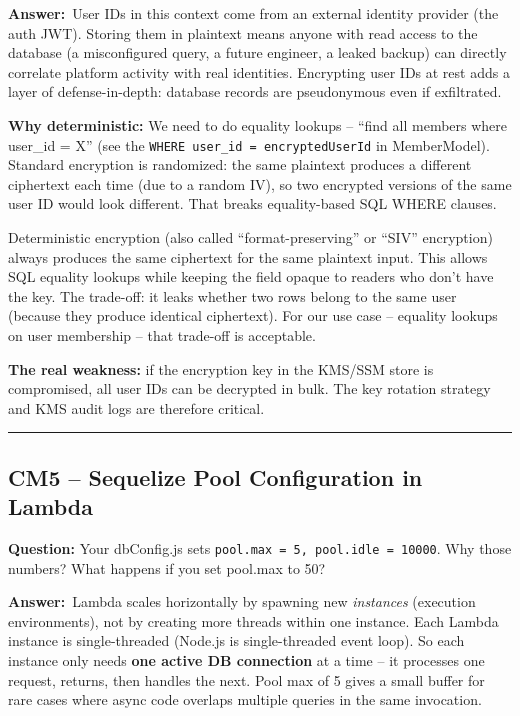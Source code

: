 \documentclass[letterpaper,10pt]{article}
\newlength{\boxwidth}
\newcommand{\questionbox}[1]{%
  \vspace{6pt}%
  \noindent\colorbox{qbg}{%
    \begin{minipage}{\boxwidth}%
      \vspace{3pt}\textbf{\textcolor{nordblue}{Question:}} #1\vspace{3pt}%
    \end{minipage}%
  }\vspace{2pt}%
}
\newcommand{\answerlabel}{\noindent\textbf{\textcolor{answerblue}{Answer:}}~}
\begin{document}
\answerlabel User IDs in this context come from an external identity provider (the auth JWT). Storing them in plaintext means anyone with read access to the database (a misconfigured query, a future engineer, a leaked backup) can directly correlate platform activity with real identities. Encrypting user IDs at rest adds a layer of defense-in-depth: database records are pseudonymous even if exfiltrated.

\textbf{Why deterministic:} We need to do equality lookups -- ``find all members where user\_id = X'' (see the \texttt{WHERE user\_id = encryptedUserId} in MemberModel). Standard encryption is randomized: the same plaintext produces a different ciphertext each time (due to a random IV), so two encrypted versions of the same user ID would look different. That breaks equality-based SQL WHERE clauses.

Deterministic encryption (also called ``format-preserving'' or ``SIV'' encryption) always produces the same ciphertext for the same plaintext input. This allows SQL equality lookups while keeping the field opaque to readers who don't have the key. The trade-off: it leaks whether two rows belong to the same user (because they produce identical ciphertext). For our use case -- equality lookups on user membership -- that trade-off is acceptable.

\textbf{The real weakness:} if the encryption key in the KMS/SSM store is compromised, all user IDs can be decrypted in bulk. The key rotation strategy and KMS audit logs are therefore critical.

\medskip\rule{\linewidth}{0.2pt}

\subsection*{CM5 -- Sequelize Pool Configuration in Lambda}

\questionbox{Your dbConfig.js sets \texttt{pool.max = 5, pool.idle = 10000}. Why those numbers? What happens if you set pool.max to 50?}

\answerlabel Lambda scales horizontally by spawning new \textit{instances} (execution environments), not by creating more threads within one instance. Each Lambda instance is single-threaded (Node.js is single-threaded event loop). So each instance only needs \textbf{one active DB connection} at a time -- it processes one request, returns, then handles the next. Pool max of 5 gives a small buffer for rare cases where async code overlaps multiple queries in the same invocation.
\end{document}

